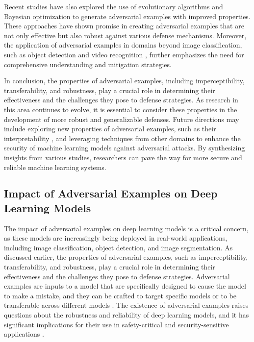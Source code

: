 \documentclass[11pt,a4paper]{article}
\begin{document}
Recent studies have also explored the use of evolutionary algorithms \cite{doi:10.1186/s41074-019-0053-3} and Bayesian optimization \cite{doi:10.1609/aaai.v34i07.6918} to generate adversarial examples with improved properties. These approaches have shown promise in creating adversarial examples that are not only effective but also robust against various defense mechanisms. Moreover, the application of adversarial examples in domains beyond image classification, such as object detection \cite{doi:10.24963/ijcai.2019/134} and video recognition \cite{doi:10.1609/aaai.v34i07.6918}, further emphasizes the need for comprehensive understanding and mitigation strategies.

In conclusion, the properties of adversarial examples, including imperceptibility, transferability, and robustness, play a crucial role in determining their effectiveness and the challenges they pose to defense strategies. As research in this area continues to evolve, it is essential to consider these properties in the development of more robust and generalizable defenses. Future directions may include exploring new properties of adversarial examples, such as their interpretability \cite{doi:10.1007/s00521-021-06812-y}, and leveraging techniques from other domains to enhance the security of machine learning models against adversarial attacks. By synthesizing insights from various studies, researchers can pave the way for more secure and reliable machine learning systems.


\subsection{Impact of Adversarial Examples on Deep Learning Models}


The impact of adversarial examples on deep learning models is a critical concern, as these models are increasingly being deployed in real-world applications, including image classification, object detection, and image segmentation. As discussed earlier, the properties of adversarial examples, such as imperceptibility, transferability, and robustness, play a crucial role in determining their effectiveness and the challenges they pose to defense strategies. Adversarial examples are inputs to a model that are specifically designed to cause the model to make a mistake, and they can be crafted to target specific models or to be transferable across different models \cite{doi:10.1145/3128572.3140444}. The existence of adversarial examples raises questions about the robustness and reliability of deep learning models, and it has significant implications for their use in safety-critical and security-sensitive applications \cite{arxiv:1511.07528}.
\end{document}
